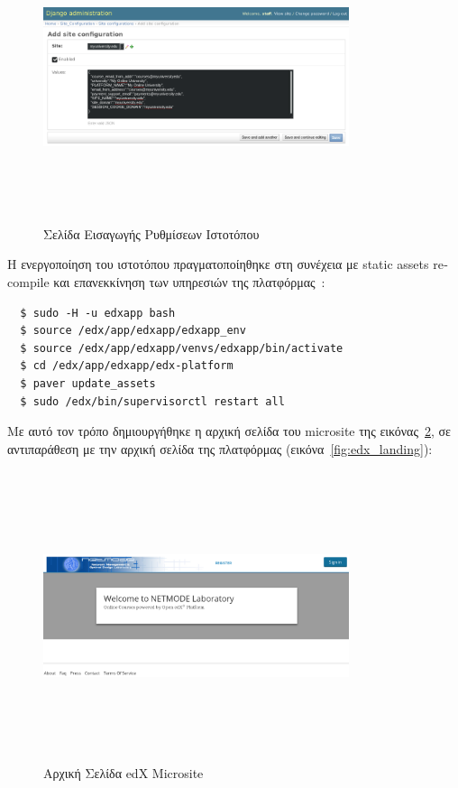 \documentclass[12pt]{report}
\begin{document}
\begin{figure}[!htbp]
\centering
\includegraphics[width=0.8\textwidth, height=8.5cm]{django-site-conf}
\caption{Σελίδα Εισαγωγής Ρυθμίσεων Ιστοτόπου}
\label{fig:django-site-conf}
\end{figure}

Η ενεργοποίηση του ιστοτόπου πραγματοποίηθηκε στη συνέχεια με \textlatin{static assets recompile} και επανεκκίνηση των υπηρεσιών της πλατφόρμας~\cite{lawrence_mcdaniel_2018}:
\begin{lstlisting}
  $ sudo -H -u edxapp bash
  $ source /edx/app/edxapp/edxapp_env
  $ source /edx/app/edxapp/venvs/edxapp/bin/activate
  $ cd /edx/app/edxapp/edx-platform
  $ paver update_assets
  $ sudo /edx/bin/supervisorctl restart all
\end{lstlisting}
Με αυτό τον τρόπο δημιουργήθηκε η αρχική σελίδα του \textlatin{microsite} της εικόνας~\ref{fig:microsite_landing}, σε αντιπαράθεση με την αρχική σελίδα της πλατφόρμας (εικόνα~\ref{fig:edx_landing}):
\begin{figure}[!htbp]
\centering
\includegraphics[width=0.8\textwidth, height=8.5cm]{microsite-landing}
\caption{Αρχική Σελίδα \textlatin{edX Microsite}}
\label{fig:microsite_landing}
\end{figure}
\end{document}
